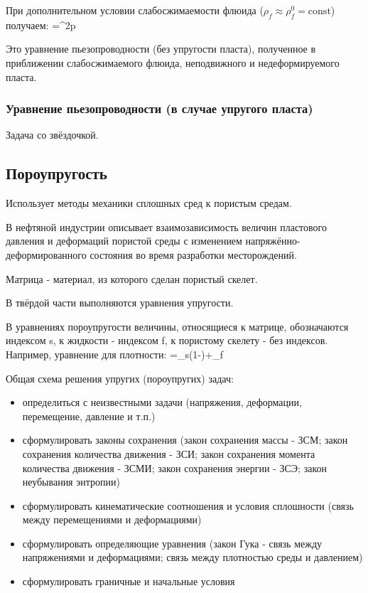 \documentclass[main.tex]{subfiles}
\begin{document}
При дополнительном условии слабосжимаемости флюида ($\rho_f\approx\rho_f^0=\textrm{const}$) получаем:
\beq
{}=\pmb{\nabla}^2p
\eeq

Это уравнение пьезопроводности (без упругости пласта), полученное в приближении слабосжимаемого флюида, неподвижного и недеформируемого пласта.

\subsubsection{Уравнение пьезопроводности (в случае упругого пласта)}

Задача со звёздочкой.

\subsection{Пороупругость}

Использует методы механики сплошных сред к пористым средам.

В нефтяной индустрии описывает взаимозависимость величин пластового давления и деформаций пористой среды с изменением напряжённо-деформированного состояния во время разработки месторождений.

Матрица - материал, из которого сделан пористый скелет.

В твёрдой части выполняются уравнения упругости.

В уравнениях пороупругости величины, относящиеся к матрице, обозначаются индексом s, к жидкости - индексом f, к пористому скелету - без индексов.
Например, уравнение для плотности:
\beq
\rho=\rho_s\left(1-\varphi\right)+\rho_f\varphi
\eeq

Общая схема решения упругих (пороупругих) задач:
\begin{itemize}
\item определиться с неизвестными задачи (напряжения, деформации, перемещение, давление и т.п.)
\item сформулировать законы сохранения (закон сохранения массы - ЗСМ; закон сохранения количества движения - ЗСИ; закон сохранения момента количества движения - ЗСМИ; закон сохранения энергии - ЗСЭ; закон неубывания энтропии)
\item сформулировать кинематические соотношения и условия сплошности (связь между перемещениями и деформациями)
\item сформулировать определяющие уравнения (закон Гука - связь между напряжениями и деформациями; связь между плотностью среды и давлением)
\item сформулировать граничные и начальные условия
\end{itemize}
\end{document}
